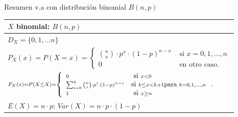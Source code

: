 \documentclass[
  ignorenonframetext,
  aspectratio=169]{beamer}
\begin{document}
\begin{frame}{Resumen v.a con distribución binomial \(B(n,p)\)}
\protect\hypertarget{resumen-v.a-con-distribuciuxf3n-binomial-bnp}{}
\renewcommand{\arraystretch}{1.75}
\begin{table}
\centering
\begin{tabular}{|l|}
\hline\rowcolor{LightBlue}
$X$ binomial:   $B(n,p)$ \\\hline
$\scriptstyle  D_X=   \{0,1,\ldots n\}$  \\\hline
$\scriptstyle P_X(x)=P(X=x)=\left\{\begin{array}{ll}\scriptstyle {n\choose x}\cdot  p^x\cdot  (1-p)^{n-x} & \mbox{ si } x=0,1,\ldots,n\\0  & \mbox{ en otro caso.}\end{array}\right.$ \\\hline
$\scriptstyle  F_X(x)=P(X\leq X)=
\scriptstyle\left\{
\begin{array}{ll}
\scriptstyle  0 & \scriptstyle  \mbox{ si } x<0\\ 
\scriptstyle \sum_{i=0}^k {n\choose i}\cdot  p^i\cdot  (1-p)^{n-i} &  
\scriptstyle \mbox{si } \scriptstyle k\leq x< k+1 \mbox{\small para } \scriptstyle k=0,1,\dots,n \\ 
\scriptstyle 1 & \scriptstyle  \mbox{ si } x\geq n
\end{array}
\right.$.\\\hline
$\scriptstyle E(X)=n\cdot p$; $\scriptstyle  Var(X)=n\cdot p \cdot (1-p)$ \\\hline
\end{tabular}
\end{table}
\end{frame}
\end{document}

